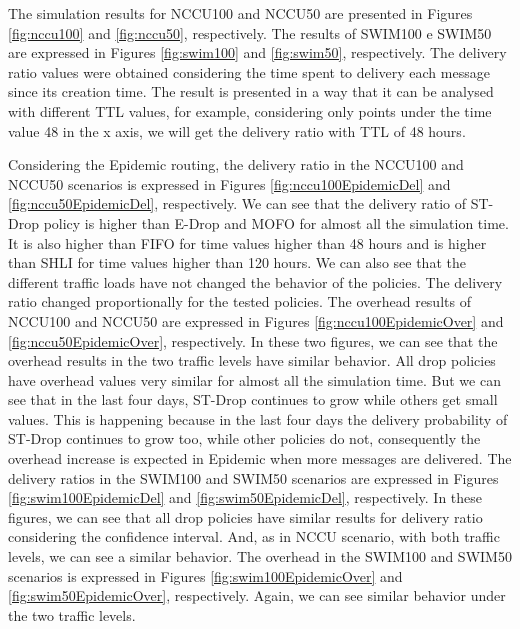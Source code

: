 The simulation results for NCCU100 and NCCU50 are presented in Figures \ref{fig:nccu100} and \ref{fig:nccu50}, respectively. The results of SWIM100 e SWIM50 are expressed in Figures
\ref{fig:swim100} and \ref{fig:swim50}, respectively.
The delivery ratio values were obtained considering the time spent to delivery each message since its creation time.
The result is presented in a way that it can be analysed with different TTL values, for example, considering only points under the time value 48 in the x axis,
we will get the delivery ratio with TTL of 48 hours.

Considering the Epidemic routing, the delivery ratio in the NCCU100 and NCCU50 scenarios is expressed in Figures \ref{fig:nccu100EpidemicDel} and \ref{fig:nccu50EpidemicDel},
respectively. We can see that the delivery ratio of ST-Drop policy is higher than E-Drop and MOFO for almost all the simulation time. It is also higher than FIFO for time values
higher than 48 hours and is higher than SHLI for time values higher than 120 hours. We can also see that the different traffic loads have not changed the behavior of the policies.
The delivery ratio changed proportionally for the tested policies. The overhead results of NCCU100 and NCCU50 are expressed in Figures \ref{fig:nccu100EpidemicOver} and
\ref{fig:nccu50EpidemicOver}, respectively. In these two figures, we can see that the overhead results in the two traffic levels have similar behavior. All drop policies
have overhead values very similar for almost all the simulation time. But we can see that in the last four days, ST-Drop continues to grow while others get small values.
This is happening because in the last four days the delivery probability of ST-Drop continues to grow too, while other policies do not, consequently the overhead increase is
expected in Epidemic when more messages are delivered. The delivery ratios in the SWIM100 and SWIM50 scenarios are expressed in Figures \ref{fig:swim100EpidemicDel} and
\ref{fig:swim50EpidemicDel}, respectively. In these figures, we can see that all drop policies have similar results for delivery ratio considering the confidence interval.
And, as in NCCU scenario, with both traffic levels, we can see a similar behavior. The overhead in the SWIM100 and SWIM50 scenarios is expressed in Figures
\ref{fig:swim100EpidemicOver} and \ref{fig:swim50EpidemicOver}, respectively. Again, we can see similar behavior under the two traffic levels.

